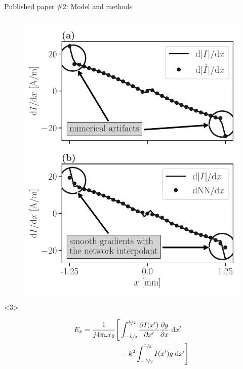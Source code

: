\documentclass[xcolor=dvipsnames,10pt]{beamer}
\begin{document}
\begin{frame}{Published paper \#2: Model and methods}
\begin{columns}[c]
\begin{column}{0.4\textwidth}
\begin{onlyenv}
\begin{center}
\begin{figure}
                    \includegraphics[width=\textwidth]{artwork/RPD-network.pdf}
                \end{figure}
                \end{center}
            \end{onlyenv}
            \begin{onlyenv}<3>
                \begin{footnotesize}
                    \begin{equation*}
                        \begin{aligned}
                        E_x = \frac{1}{j4\pi\omega\epsilon_0} \Bigg[{}&  \int_{-\nicefrac{L}{2}}^{\nicefrac{L}{2}} \frac{\partial I(x')}{\partial x'} \frac{\partial g}{\partial x} \; \mathrm{d}x' \\
                        &  -k^2 \int_{-\nicefrac{L}{2}}^{\nicefrac{L}{2}} I(x') g \; \mathrm{d}x' \Bigg]
                        \end{aligned}
                    \end{equation*}
                    \begin{equation*}

\end{equation*}
\end{footnotesize}
\end{onlyenv}
\end{column}
\end{columns}
\end{frame}
\end{document}
